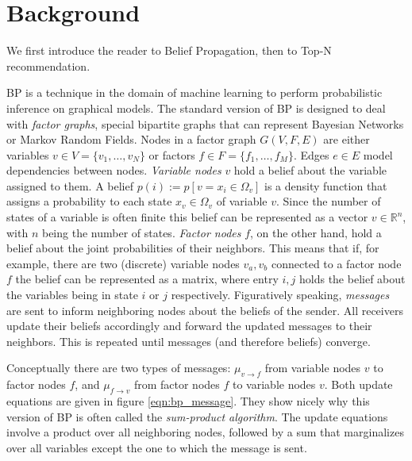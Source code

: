 \section{Background}\label{sec:background}
We first introduce the reader to Belief Propagation, then to Top-N recommendation.

BP is a technique in the domain of machine learning to perform probabilistic inference on graphical models. The standard version of BP is designed to deal with \textit{factor graphs}, special bipartite graphs that can represent Bayesian Networks or Markov Random Fields. Nodes in a factor graph $G(V,F,E)$ are either variables $v \in V = \{ v_1, \ldots, v_N \}$ or factors $f \in F = \{f_1, \ldots, f_M \}$. Edges $e\in E$ model dependencies between nodes.
\textit{Variable nodes} $v$ hold a belief about the variable assigned to them. A belief $p(i):=p[v=x_i\in\Omega_{v}]$ is a density function that assigns a probability to each state $x_v \in \Omega_v$ of variable $v$. Since the number of states of a variable is often finite this belief can be represented as a vector $v \in \mathbb{R}^n$, with $n$ being the number of states. 
\textit{Factor nodes} $f$, on the other hand, hold a belief about the joint probabilities of their neighbors. 
This means that if, for example, there are two (discrete) variable nodes $v_a, v_b$ connected to a factor node $f$ the belief can be represented as a matrix, where entry $i,j$ holds the belief about the variables being in state $i$ or $j$ respectively. Figuratively speaking, \textit{messages} are sent to inform neighboring nodes about the beliefs of the sender. All receivers update their beliefs accordingly and forward the updated messages to their neighbors. This is repeated until messages (and therefore beliefs) converge. 

Conceptually there are two types of messages: $\mu_{v\rightarrow f}$ from variable nodes $v$ to factor nodes $f$, and $\mu_{f\rightarrow v}$ from factor nodes $f$ to variable nodes $v$. Both update equations are given in figure \ref{eqn:bp_message}. They show nicely why this version of BP is often called the \textit{sum-product algorithm}. The update equations involve a product over all neighboring nodes, followed by a sum that marginalizes over all variables except the one to which the message is sent.

